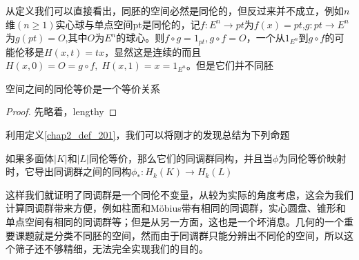 从定义我们可以直接看出，同胚的空间必然是同伦的，但反过来并不成立，例如$n$维$(n\geq 1)$实心球与单点空间pt是同伦的，记$f:E^{n}\rightarrow pt$为$f(x)=pt$,$g:pt\rightarrow E^{n}$为$g(pt)=O$,其中$O$为$E^{n}$的球心。则$f\circ g=1_{pt},g\circ f=O$，一个从$1_{E^{n}}$到$g\circ f$的可能伦移是$H(x,t)=tx$，显然这是连续的而且$H(x,0)=O=g\circ f,\;H(x,1)=x=1_{E^{n}}$。但是它们并不同胚
\begin{proposition}
空间之间的同伦等价是一个等价关系
\end{proposition}
\begin{proof}
先略着，lengthy
\end{proof}

利用定义\eqref{chap2_def_201}，我们可以将刚才的发现总结为下列命题
\begin{theorem}[同调群的同伦不变性]\label{chap2_theorem_213}
如果多面体$|K|$和$|L|$同伦等价，那么它们的同调群同构，并且当$\phi$为同伦等价映射时，它导出同调群之间的同构$\phi_{*}:H_{k}(K)\rightarrow H_{k}(L)$
\end{theorem}
这样我们就证明了同调群是一个同伦不变量，从较为实际的角度考虑，这会为我们计算同调群带来方便，例如柱面和M\"obius带有相同的同调群，实心圆盘、锥形和单点空间有相同的同调群等；但是从另一方面，这也是一个坏消息。几何的一个重要课题就是分类不同胚的空间，然而由于同调群只能分辨出不同伦的空间，所以这个筛子还不够精细，无法完全实现我们的目的。